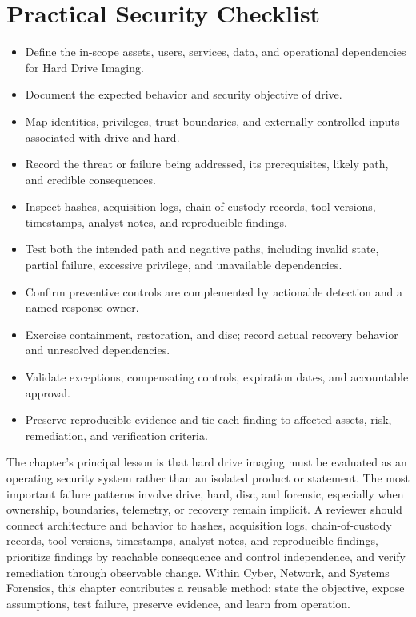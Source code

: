 \documentclass[11pt]{article}
\begin{document}
\section*{Practical Security Checklist}
\begin{itemize}[label=$\square$]
\item Define the in-scope assets, users, services, data, and operational dependencies for Hard Drive Imaging.
\item Document the expected behavior and security objective of drive.
\item Map identities, privileges, trust boundaries, and externally controlled inputs associated with drive and hard.
\item Record the threat or failure being addressed, its prerequisites, likely path, and credible consequences.
\item Inspect hashes, acquisition logs, chain-of-custody records, tool versions, timestamps, analyst notes, and reproducible findings.
\item Test both the intended path and negative paths, including invalid state, partial failure, excessive privilege, and unavailable dependencies.
\item Confirm preventive controls are complemented by actionable detection and a named response owner.
\item Exercise containment, restoration, and disc; record actual recovery behavior and unresolved dependencies.
\item Validate exceptions, compensating controls, expiration dates, and accountable approval.
\item Preserve reproducible evidence and tie each finding to affected assets, risk, remediation, and verification criteria.
\end{itemize}
\begin{synthesisbox}
The chapter's principal lesson is that hard drive imaging must be evaluated as an operating security system rather than an isolated product or statement. The most important failure patterns involve drive, hard, disc, and forensic, especially when ownership, boundaries, telemetry, or recovery remain implicit. A reviewer should connect architecture and behavior to hashes, acquisition logs, chain-of-custody records, tool versions, timestamps, analyst notes, and reproducible findings, prioritize findings by reachable consequence and control independence, and verify remediation through observable change. Within Cyber, Network, and Systems Forensics, this chapter contributes a reusable method: state the objective, expose assumptions, test failure, preserve evidence, and learn from operation.
\end{synthesisbox}
\end{document}
